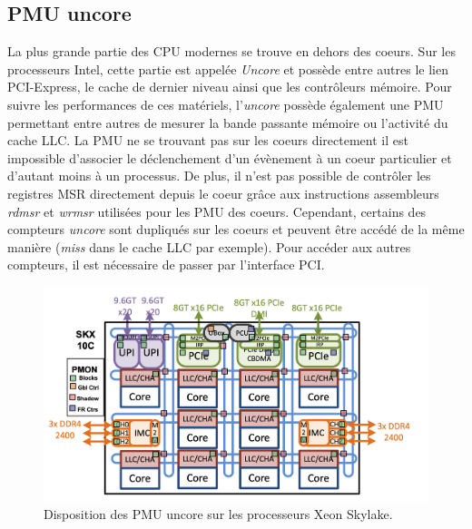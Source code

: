     \subsection{PMU uncore}\label{sec:edl_perf_uncore}
    
    
        La plus grande partie des CPU modernes se trouve en dehors des coeurs. Sur les processeurs Intel, cette partie est appelée \textit{Uncore} et possède entre autres le lien PCI-Express, le cache de dernier niveau ainsi que les contrôleurs mémoire. Pour suivre les performances de ces matériels, l'\textit{uncore} possède également une PMU permettant entre autres de mesurer la bande passante mémoire ou l'activité du cache LLC. La PMU ne se trouvant pas sur les coeurs directement il est impossible d'associer le déclenchement d'un évènement à un coeur particulier et d'autant moins à un processus. De plus, il n'est pas possible de contrôler les registres MSR directement depuis le coeur grâce aux instructions assembleurs \textit{rdmsr} et \textit{wrmsr} utilisées pour les PMU des coeurs. Cependant, certains des compteurs \textit{uncore} sont dupliqués sur les coeurs et peuvent être accédé de la même manière (\textit{miss} dans le cache LLC par exemple). Pour accéder aux autres compteurs, il est nécessaire de passer par l'interface PCI.
        
         
        \begin{figure}
        \center
        \includegraphics[width=12cm]{images/edl_perf_uncore_intel_skl.png}
        \caption{\label{fig:edl_perf_uncore_intel_skl} Disposition des PMU uncore sur les processeurs Xeon Skylake. \protect\footnotemark}
        \end{figure}
    
        
